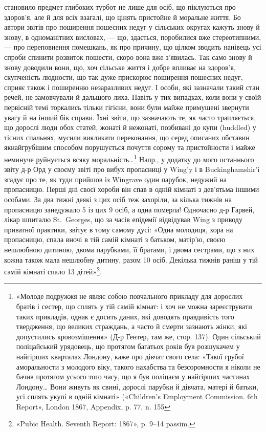 \parcont{}  %
становило предмет глибоких турбот не лише для осіб, що піклуються
про здоров’я, але й для всіх взагалі, що цінять пристойне
й моральне життя. Бо автори звітів про поширення пошесних
недуг у сільських округах кажуть знову й знову, в одноманітних
висловах, — що, здається, поробилися вже стереотипними, — про
переповнення помешкань, як про причину, що цілком зводить
нанівець усі спроби спинити розвиток пошести, скоро вона вже
з’явилась. Так само знову й знову доводили вони, що, хоч сільське
життя і добре впливає на здоров’я, скупченість людности,
що так дуже прискорює поширення пошесних недуг, сприяє
також і поширенню незаразливих недуг. І особи, які зазначали
такий стан речей, не замовчували й дальшого лиха. Навіть у тих
випадках, коли вони у своїй первісній темі торкались тільки
гігієни, вони були майже примушені звернути увагу й на інший
бік справи. Їхні звіти, що зазначають те, як часто трапляється, що
дорослі люди обох статей, жонаті й нежонаті, позбивані до купи
(huddled) у тісних спальнях, мусили викликати переконання,
що серед описаних обставин якнайгрубішим способом порушується
почуття сорому та пристойности і майже неминуче руйнується
всяку моральність\dots{}\footnote{
«Молоде подружжя не являє собою повчального прикладу для
дорослих братів і сестер, що сплять у тій самій кімнат: і хоч не можна
зареєструвати таких прикладів, однак є досить даних, які доводять правдивість
того твердження, що великих страждань, а часто й смерти зазнають
жінки, які допустились кровозмішення» (Д-р Гентер, там же, стор. 137).
Один сільський поліцайський урядовець, що протягом багатьох років
був розшукачем у найгірших кварталах Лондону, каже про дівчат свого
села: «Такої грубої аморальности з молодого віку, такого нахабства
та безсоромности я ніколи не бачив протягом усього того часу, що я був
поліцаєм у найгірших частинах Лондону\dots{} Вони живуть як свині, дорослі
парубки й дівчата, матері й батьки, усі сплять укупі в одній кімнаті»
(«Children’s Employment Commission. 6th Report», London 1867, Appendix,
p. 77, n. 155
} Напр., у додатку до мого останнього звіту
д-р Орд у своєму звіті про вибух пропасниці у Wing’y і в Buckinghamshir’i
згадує про те, як туди прийшов із Wingrave один
парубок, недужий на пропасницю. Перші дні своєї хороби він
спав в одній кімнаті з дев’ятьма іншими особами. За два тижні
деякі з цих осіб теж захоріли, за кілька тижнів на пропасницю
занедужало 5 із цих 9 осіб, а одна померла! Одночасно
д-р Гарвей, лікар шпиталю St.~Georges, що за часів епідемії відвідував
Wing з приводу приватної практики, звітує в тому самому
дусі: «Одна молодиця, хора на пропасницю, спала вночі
в тій самій кімнаті з батьком, матір’ю, своєю нешлюбною дитиною,
двома парубками, її братами, і двома сестрами, що з них
кожна також мала нешлюбну дитину, разом 10 осіб. Декілька
тижнів раніш у тій самій кімнаті спало 13 дітей»\footnote{
«Pubic Health. Seventh Report: 1867», p. 9--14 passim.
}.

